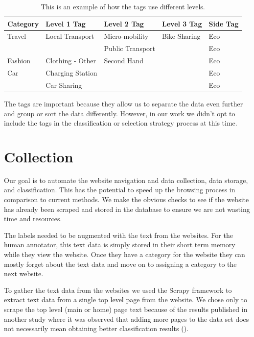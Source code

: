 \begin{table}[h]
\begin{tabular}{|l|l|l|l|l|}
\hline
Category    & Level 1 Tag           & Level 2 Tag        & Level 3 Tag  & Side Tag \\ \hline
Travel      & Local Transport       & Micro-mobility     & Bike Sharing & Eco      \\ \hline
            &                       & Public Transport   &              & Eco      \\ \hline
Fashion     & Clothing - Other      & Second Hand        &              & Eco      \\ \hline
Car         & Charging Station      &                    &              & Eco      \\ \hline
            & Car Sharing           &                    &              & Eco      \\ \hline
\end{tabular}
\caption{This is an example of how the tags use different levels.}
\label{tab:tags}
\end{table}

The tags are important because they allow us to separate the data even further and group or sort the data differently. However, in our work we didn't opt to include the tags in the classification or selection strategy process at this time.

\section{Collection}

Our goal is to automate the website navigation and data collection, data storage, and classification. This has the potential to speed up the browsing process in comparison to current methods. We make the obvious checks to see if the website has already been scraped and stored in the database to ensure we are not wasting time and resources.

The labels needed to be augmented with the text from the websites. For the human annotator, this text data is simply stored in their short term memory while they view the website. Once they have a category for the website they can mostly forget about the text data and move on to assigning a category to the next website.

To gather the text data from the websites we used the Scrapy framework to extract text data from a single top level page from the website. We chose only to scrape the top level (main or home) page text because of the results published in another study where it was observed that adding more pages to the data set does not necessarily mean obtaining better classification results (\cite{sahid2019ecommerce}). 

